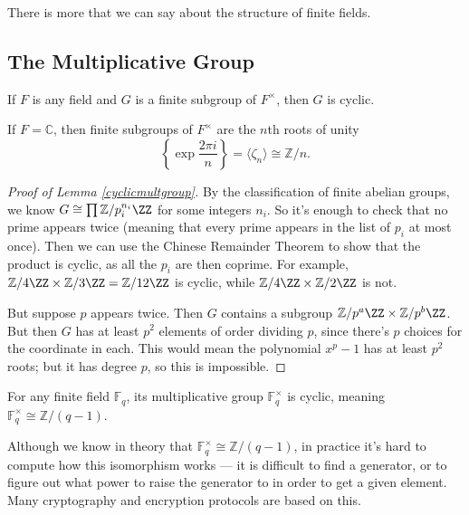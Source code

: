 There is more that we can say about the structure of finite fields. 

\subsection{The Multiplicative Group}

\vspace{0.75em}

\begin{lemma}\label{cyclicmultgroup}
    If $F$ is any field and $G$ is a finite subgroup of $F^\times$, then $G$ is cyclic. 
\end{lemma}

\begin{example}
    If $F = \mathbb{C}$, then finite subgroups of $F^\times$ are the $n$th roots of unity \[\left\{\exp \frac{2\pi i}{n} \right\} = \langle \zeta_n \rangle \cong \mathbb{Z}/n.\] 
\end{example}

\begin{proof}[Proof of Lemma \ref{cyclicmultgroup}]
    By the classification of finite abelian groups, we know $G \cong \prod \mathbb{Z}/p_i^{n_i}\ZZ$ for some integers $n_i$. So it's enough to check that no prime appears twice (meaning that every prime appears in the list of $p_i$ at most once). Then we can use the Chinese Remainder Theorem to show that the product is cyclic, as all the $p_i$ are then coprime. For example, $\mathbb{Z}/4\ZZ \times \mathbb{Z}/3\ZZ = \mathbb{Z}/12\ZZ$ is cyclic, while $\mathbb{Z}/4\ZZ \times \mathbb{Z}/2\ZZ$ is not. 

    But suppose $p$ appears twice. Then $G$ contains a subgroup $\mathbb{Z}/p^a\ZZ \times \mathbb{Z}/p^b\ZZ$. But then $G$ has at least $p^2$ elements of order dividing $p$, since there's $p$ choices for the coordinate in each. This would mean the polynomial $x^p - 1$ has at least $p^2$ roots; but it has degree $p$, so this is impossible. 
\end{proof}

\begin{corollary}
    For any finite field $\mathbb{F}_q$, its multiplicative group $\mathbb{F}_q^\times$ is cyclic, meaning $\mathbb{F}_q^\times \cong \mathbb{Z}/(q - 1)$. 
\end{corollary}

\begin{note}
    Although we know in theory that $\mathbb{F}_q^\times \cong \mathbb{Z}/(q - 1)$, in practice it's hard to compute how this isomorphism works --- it is difficult to find a generator, or to figure out what power to raise the generator to in order to get a given element. Many cryptography and encryption protocols are based on this. 
\end{note}


